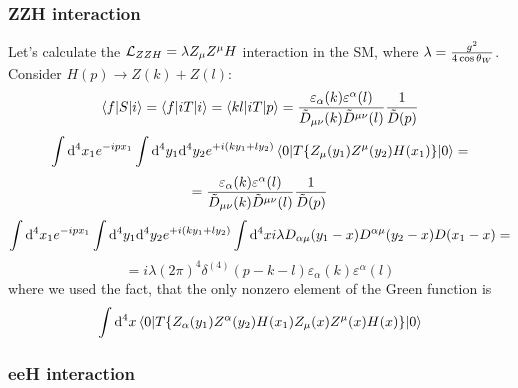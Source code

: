 \subsubsection{ZZH interaction}

Let's calculate the ${\mathcal L}_{ZZH}=\lambda Z_\mu Z^\mu H$ interaction in the SM, where $\lambda={g^2\over4\cos\theta_W}$. Consider $H(p)\to Z(k)+Z(l)$: 
\begin{equation*}
  \mathinner{\langle{f|S|i}\rangle}= \mathinner{\langle{f|iT|i}\rangle}= \mathinner{\langle{k l|iT|p}\rangle}= {\varepsilon_\alpha(k)\varepsilon^\alpha(l)\over\tilde D_{\mu\nu}(k)\tilde D^{\mu\nu}(l)} {1\over\tilde D(p)}
\end{equation*}
\begin{equation*}
  \int{\rm d}^4 x_1 e^{-i p x_1} \int{\rm d}^4 y_1 {\rm d}^4 y_2 e^{+i(k y_1+l y_2)} \mathinner{\langle{0|T\{Z_\mu(y_1) Z^\mu(y_2) H(x_1)\}|0}\rangle} =
\end{equation*}
\begin{equation*}
  = {\varepsilon_\alpha(k)\varepsilon^\alpha(l)\over\tilde D_{\mu\nu}(k)\tilde D^{\mu\nu}(l)} {1\over\tilde D(p)}
\end{equation*}
\begin{equation*}
  \int{\rm d}^4 x_1 e^{-i p x_1} \int{\rm d}^4 y_1 {\rm d}^4 y_2 e^{+i(k y_1+l y_2)}\int{\rm d}^4 x i\lambda D_{\alpha\mu}(y_1-x)D^{\alpha\mu}(y_2-x)D(x_1-x) =
\end{equation*}
\begin{equation*}
  =i\lambda(2\pi)^4\delta^{(4)}(p-k-l)\varepsilon_\alpha(k)\varepsilon^\alpha(l)
\end{equation*}
where we used the fact, that the only nonzero element of the Green function is 
\begin{equation*}
  \int{\rm d}^4 x \mathinner{\langle{0|T\{Z_\alpha(y_1) Z^\alpha(y_2) H(x_1)Z_\mu(x)Z^\mu(x) H(x)\}|0}\rangle}
\end{equation*}

\subsubsection{eeH interaction}

